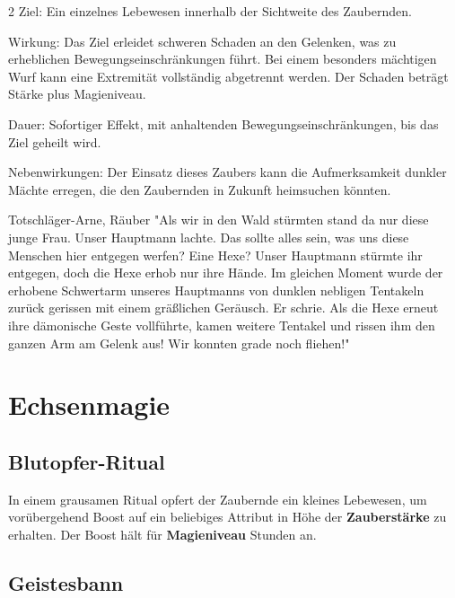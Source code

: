 \begin{multicols*}{2}
Ziel: Ein einzelnes Lebewesen innerhalb der Sichtweite des Zaubernden.

Wirkung: Das Ziel erleidet schweren Schaden an den Gelenken, was zu erheblichen Bewegungseinschränkungen führt. Bei einem besonders mächtigen Wurf kann eine Extremität vollständig abgetrennt werden. Der Schaden beträgt Stärke plus Magieniveau.

Dauer: Sofortiger Effekt, mit anhaltenden Bewegungseinschränkungen, bis das Ziel geheilt wird.

Nebenwirkungen: Der Einsatz dieses Zaubers kann die Aufmerksamkeit dunkler Mächte erregen, die den Zaubernden in Zukunft heimsuchen könnten.

\begin{pquote}{Totschläger-Arne, Räuber}
"Als wir in den Wald stürmten stand da nur diese junge Frau. Unser Hauptmann lachte. Das sollte alles sein, was uns diese Menschen hier entgegen werfen? Eine Hexe? Unser Hauptmann stürmte ihr entgegen, doch die Hexe erhob nur ihre Hände. Im gleichen Moment wurde der erhobene Schwertarm unseres Hauptmanns von dunklen nebligen Tentakeln zurück gerissen mit einem gräßlichen Geräusch. Er schrie. Als die Hexe erneut ihre dämonische Geste vollführte, kamen weitere Tentakel und rissen ihm den ganzen Arm am Gelenk aus! Wir konnten grade noch fliehen!"
\end{pquote}



\section{Echsenmagie}

\subsection{Blutopfer-Ritual}

In einem grausamen Ritual opfert der Zaubernde ein kleines Lebewesen, um vorübergehend Boost auf ein beliebiges Attribut in Höhe der \textbf{Zauberstärke} zu erhalten. Der Boost hält für \textbf{Magieniveau} Stunden an.



\subsection{Geistesbann}


\end{multicols*}
